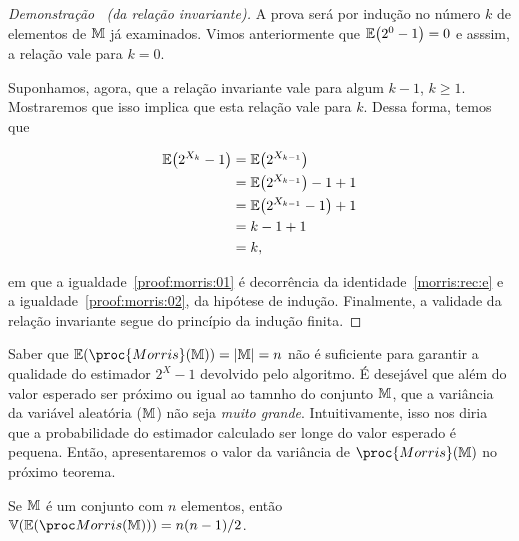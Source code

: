 \begin{proof}[Demonstração \ (da relação invariante)]
  A prova será por indução no número $k$ de elementos de $\mathbb{M}$ já examinados. Vimos anteriormente que 
  $\mathbb{E}\big(2^0 - 1 \big) = 0$ e asssim, a relação vale para $k = 0$.

  Suponhamos, agora, que a relação invariante vale para algum $k - 1$, $k \geq 1$. Mostraremos que isso implica que esta
  relação vale para $k$. Dessa forma, temos que

  \begin{align}
      \mathbb{E}\big(2^{X_k} - 1\big) 
      &= \mathbb{E}\big(2^{X_{k-1}}\big)  \label{proof:morris:01}  \\
      &= \mathbb{E}\big(2^{X_{k-1}}\big) - 1 + 1 \nonumber \\
      &= \mathbb{E}\big(2^{X_{k-1}} - 1\big) + 1 \nonumber \\
      &= k - 1 + 1 \label{proof:morris:02} \\ 
      &= k \nonumber,
    \end{align}    

    em que a igualdade~\eqref{proof:morris:01} é decorrência da identidade~\eqref{morris:rec:e} e a 
    igualdade~\eqref{proof:morris:02}, da hipótese de indução. Finalmente, a validade da relação invariante segue do 
    princípio da indução finita.
\end{proof}  

Saber que $\Ebb(\proc{Morris}(\Mbb)) = |\Mbb| = n$ não é suficiente para garantir a qualidade do estimador $2^{X} - 1$
devolvido pelo algoritmo. É desejável que além do valor esperado ser próximo ou igual ao tamnho do conjunto $\mathbb{M}$, que
a variância da variável aleatória ($\mathbb{M}$) não seja \textit{muito grande}. Intuitivamente, isso nos diria 
que a probabilidade do estimador calculado ser longe do valor esperado é pequena. Então, apresentaremos o valor da 
variância de $\proc{Morris}(\Mbb)$ no próximo teorema.

\begin{theorem}[da variância]
  \label{morris:theorem:variance}
  Se $\mathbb{M}$ é um conjunto com $n$ elementos, então $\Vbb(\Ebb(\morrisestimator)) = n(n - 1) / 2$.
\end{theorem}

